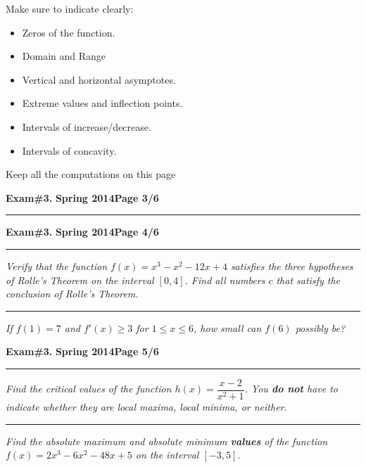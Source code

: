 \documentclass[12pt]{article}
\begin{document}
Make sure to indicate clearly:
\begin{itemize}
\item Zeros of the function.
\item Domain and Range
\item Vertical and horizontal asymptotes.
\item Extreme values and inflection points.
\item Intervals of increase/decrease.
\item Intervals of concavity.
\end{itemize}

Keep all the computations on this page
\newpage

\hfill{\large\bf Exam\#3.}\hfill{\large\bf
  Spring 2014}\hfill{\large\bf Page 3/6}\hrule

\newpage 

\hfill{\large\bf Exam\#3.}\hfill{\large\bf
  Spring 2014}\hfill{\large\bf Page 4/6}\hrule

\bigskip
{\problem[10 pts] \em Verify that the function $f(x)=x^3-x^2-12x+4$ satisfies the three hypotheses of Rolle's Theorem on the interval $[0,4]$.  Find all numbers $c$ that satisfy the conclusion of Rolle's Theorem.}

\vspace{13cm}
\hrule
{\problem[10] \em If $f(1)=7$ and $f'(x)\geq 3$ for $1\leq x \leq 6$, how small can $f(6)$ possibly be?}
\vspace{6cm}
\begin{flushright}
\end{flushright}
\newpage

\hfill{\large\bf Exam\#3.}\hfill{\large\bf
  Spring 2014}\hfill{\large\bf Page 5/6}\hrule

\bigskip
{\problem[10 pts] \em Find the critical values of the function $h(x)=\dfrac{x-2}{x^2+1}$.  You \textbf{do not} have to indicate whether they are local maxima, local minima, or neither.}

\vspace{10cm}
\hrule
{\problem[10pts] \em Find the absolute maximum and absolute minimum \textbf{values} of the function $f(x)=2x^3-6x^2-48x+5$ on the interval $[-3,5]$.}
\newpage
\end{document}
